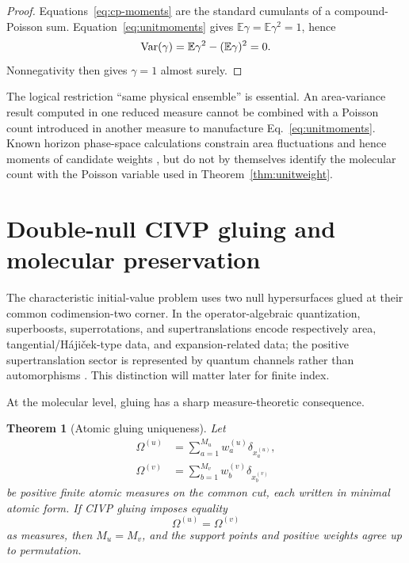 \documentclass[aps,prd,preprint,nofootinbib,superscriptaddress]{revtex4-2}
\newtheorem{theorem}{Theorem}[section]
\theoremstyle{definition}
\theoremstyle{remark}
\begin{document}
\begin{proof}
Equations~\eqref{eq:cp-moments} are the standard cumulants of a compound-Poisson sum.  Equation~\eqref{eq:unitmoments} gives $\mathbb E\gamma=\mathbb E\gamma^2=1$, hence
\[
{\rm Var}(\gamma)=\mathbb E\gamma^2-(\mathbb E\gamma)^2=0.
\]
Nonnegativity then gives $\gamma=1$ almost surely.
\end{proof}

The logical restriction ``same physical ensemble'' is essential.  An area-variance result computed in one reduced measure cannot be combined with a Poisson count introduced in another measure to manufacture Eq.~\eqref{eq:unitmoments}.  Known horizon phase-space calculations constrain area fluctuations and hence moments of candidate weights \cite{CiambelliHeZurek2025}, but do not by themselves identify the molecular count with the Poisson variable used in Theorem~\ref{thm:unitweight}.

\section{Double-null CIVP gluing and molecular preservation}
\label{sec:gluing}

The characteristic initial-value problem uses two null hypersurfaces glued at their common codimension-two corner.  In the operator-algebraic quantization, superboosts, superrotations, and supertranslations encode respectively area, tangential/Háji\v{c}ek-type data, and expansion-related data; the positive supertranslation sector is represented by quantum channels rather than automorphisms \cite{CiambelliKlinger2026}.  This distinction will matter later for finite index.

At the molecular level, gluing has a sharp measure-theoretic consequence.

\begin{theorem}[Atomic gluing uniqueness]
\label{thm:atomicgluing}
Let
\begin{align}
\Omega^{(u)}
&=
\sum_{a=1}^{M_u}
w_a^{(u)}\delta_{x_a^{(u)}},
\\
\Omega^{(v)}
&=
\sum_{b=1}^{M_v}
w_b^{(v)}\delta_{x_b^{(v)}}
\end{align}
be positive finite atomic measures on the common cut, each written in minimal atomic form.  If CIVP gluing imposes equality
\begin{equation}
\Omega^{(u)}=\Omega^{(v)}
\label{eq:measuregluing}
\end{equation}
as measures, then $M_u=M_v$, and the support points and positive weights agree up to permutation.
\end{theorem}
\end{document}
